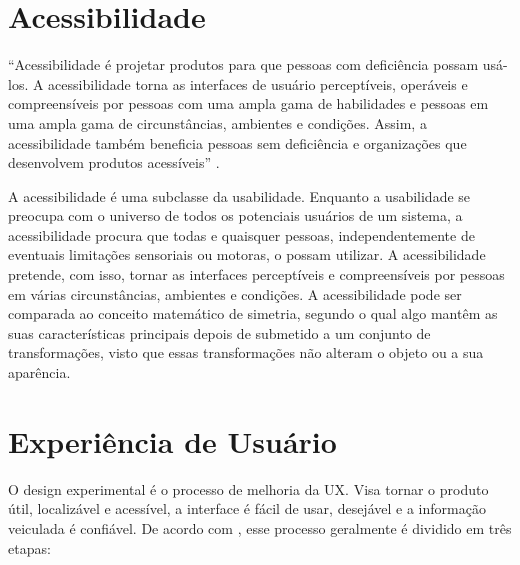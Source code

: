 \section{Acessibilidade}
\label{Acessibilidade}

 \begin{citacao}
 “Acessibilidade é projetar produtos para que pessoas com deficiência possam usá-los. A acessibilidade torna as interfaces de usuário perceptíveis, operáveis e compreensíveis por pessoas com uma ampla gama de habilidades e pessoas em uma ampla gama de circunstâncias, ambientes e condições. Assim, a acessibilidade também beneficia pessoas sem deficiência e organizações que desenvolvem produtos acessíveis” \cite{slhjustask}.
\end{citacao}

A acessibilidade é uma subclasse da usabilidade. Enquanto a usabilidade se preocupa com o universo de todos os potenciais usuários de um sistema, a acessibilidade procura que todas e quaisquer pessoas, independentemente de eventuais limitações sensoriais ou motoras, o possam utilizar. A acessibilidade pretende, com isso, tornar as interfaces perceptíveis e compreensíveis por pessoas em várias circunstâncias, ambientes e condições. A acessibilidade pode ser comparada ao conceito matemático de simetria, segundo o qual algo mantêm as suas características principais depois de submetido a um conjunto de transformações, visto que essas transformações não alteram o objeto ou a sua aparência. \cite{matos2021estudo} 
 
\section{Experiência de Usuário}
\label{Experiência_de_Usuário}

O design experimental é o processo de melhoria da \acf{UX}. Visa tornar o produto útil, localizável e acessível, a interface é fácil de usar, desejável e a informação veiculada é confiável. De acordo com \cite{brito2016usabilidade}, esse processo geralmente é dividido em três etapas:

